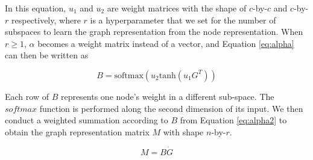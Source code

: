 \documentclass[conference]{IEEEtran}
\begin{document}
		In this equation, $u_1$ and $u_2$ are weight matrices with the shape of $c$-by-$c$ and $c$-by-$r$ respectively, where $r$ is a hyperparameter that we set for the number of subspaces to learn the graph representation from the node representation. When $r \geq 1$, $\alpha$ becomes a weight matrix instead of a vector, and Equation \ref{eq:alpha} can then be written as
		
		\begin{equation}
			B = \text{softmax}(u_2 \text{tanh}(u_1 G^T))
			\label{eq:alpha2}			
		\end{equation}
		
		Each row of $B$ represents one node's weight in a different sub-space. The $softmax$ function is performed along the second dimension of its input. We then conduct a weighted summation according to $B$ from Equation \ref{eq:alpha2} to obtain the graph representation matrix $M$ with shape $n$-by-$r$.
		
		\begin{equation}
		 M = B \dot G
		 \label{eq:eq4}
		\end{equation}
		
\end{document}
